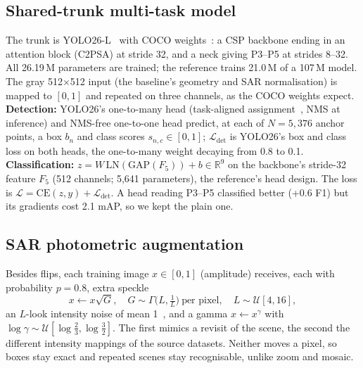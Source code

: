 \subsection{Shared-trunk multi-task model}
\label{sec:model}
The trunk is YOLO26-L~\cite{jocher2026yolo26} with COCO weights~\cite{lin2014coco}: a CSP backbone ending in an
attention block (C2PSA) at stride 32, and a neck giving P3--P5 at strides 8--32.
All 26.19\,M parameters are trained; the reference trains 21.0\,M of a 107\,M model.
The gray 512$\times$512 input (the baseline's geometry and SAR normalisation) is mapped to $[0,1]$ and repeated on
three channels, as the COCO weights expect.
\textbf{Detection:} YOLO26's one-to-many head (task-aligned assignment~\cite{feng2021tood}, NMS at inference) and
NMS-free one-to-one head predict, at each of $N{=}5{,}376$ anchor points, a box $b_n$ and class scores
$s_{n,c}\in[0,1]$; $\mathcal{L}_\text{det}$ is YOLO26's box and class loss on both heads, the one-to-many weight decaying
from 0.8 to 0.1.
\textbf{Classification:} $z=W\,\mathrm{LN}(\mathrm{GAP}(F_5))+b\in\mathbb{R}^9$ on the backbone's stride-32 feature
$F_5$ (512 channels; 5{,}641 parameters), the reference's head design.
The loss is $\mathcal{L}=\mathrm{CE}(z,y)+\mathcal{L}_\text{det}$.
A head reading P3--P5 classified better (+0.6 F1) but its gradients cost 2.1 mAP, so we kept the plain one.

\subsection{SAR photometric augmentation}
\label{sec:aug}
Besides flips, each training image $x\in[0,1]$ (amplitude) receives, each with probability $p{=}0.8$, extra speckle
\begin{equation}
  x\leftarrow x\sqrt{G},\quad G\sim\Gamma\big(L,\tfrac1L\big)\ \text{per pixel},\quad L\sim\mathcal{U}[4,16],
  \label{eq:speckle}
\end{equation}
an $L$-look intensity noise of mean 1~\cite{argenti2013speckle}, and a gamma $x\leftarrow x^{\gamma}$ with
$\log\gamma\sim\mathcal{U}[\log\tfrac23,\log\tfrac32]$.
The first mimics a revisit of the scene, the second the different intensity mappings of the source datasets.
Neither moves a pixel, so boxes stay exact and repeated scenes stay recognisable, unlike zoom and mosaic.

